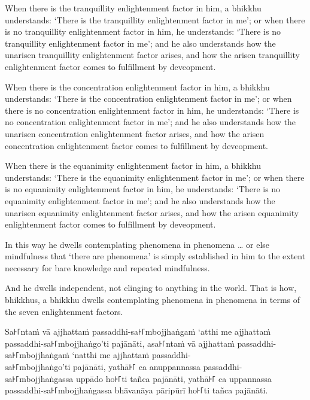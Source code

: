 \englishPage

When there is the tranquillity enlightenment factor in him, a bhikkhu
understands: `There is the tranquillity enlightenment factor in me'; or when
there is no tranquillity enlightenment factor in him, he understands: `There is
no tranquillity enlightenment factor in me'; and he also understands how the
unarisen tranquillity enlightenment factor arises, and how the arisen
tranquillity enlightenment factor comes to fulfillment by deveopment.

When there is the concentration enlightenment factor in him, a bhikkhu
understands: `There is the concentration enlightenment factor in me'; or when
there is no concentration enlightenment factor in him, he understands: `There is
no concentration enlightenment factor in me'; and he also understands how the
unarisen concentration enlightenment factor arises, and how the arisen
concentration enlightenment factor comes to fulfillment by deveopment.

When there is the equanimity enlightenment factor in him, a bhikkhu understands:
`There is the equanimity enlightenment factor in me'; or when there is no
equanimity enlightenment factor in him, he understands: `There is no equanimity
enlightenment factor in me'; and he also understands how the unarisen equanimity
enlightenment factor arises, and how the arisen equanimity enlightenment factor
comes to fulfillment by deveopment.

\enlargethispage{2\baselineskip}

In this way he dwells contemplating phenomena in phenomena \ldots{} or else
mindfulness that ‘there are phenomena’ is simply established in him to the
extent necessary for bare knowledge and repeated mindfulness.

And he dwells independent, not clinging to anything in the world. That is how,
bhikkhus, a bhikkhu dwells contemplating phenomena in phenomena in terms of the
seven enlightenment factors.


\paliPage

Sa꜔꜒ntaṁ vā ajjhattaṁ passaddhi-sa꜔꜒mbojjhaṅgaṁ ‘atthi me ajjhattaṁ passaddhi-sa꜔꜒mbojjhaṅgo’ti pajānāti,
asa꜔꜒ntaṁ vā ajjhattaṁ passaddhi-sa꜔꜒mbojjhaṅgaṁ ‘natthi me ajjhattaṁ passaddhi-\\ sa꜔꜒mbojjhaṅgo’ti pajānāti,
yathā꜔꜒ ca anuppannassa passaddhi-\\ sa꜔꜒mbojjhaṅgassa uppādo ho꜔꜒ti tañca pajānāti,
yathā꜔꜒ ca uppannassa passaddhi-sa꜔꜒mbojjhaṅgassa bhāvanāya pāripūrī ho꜔꜒ti tañca pajānāti.


